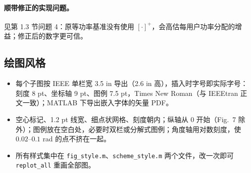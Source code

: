 \documentclass[11pt,a4paper]{ctexart}
\newcommand{\code}[1]{\texttt{#1}}
\begin{document}
\paragraph{顺带修正的实现问题。}见第 1.3 节问题 4：原等功率基准没有使用 $[\cdot]^+$，会高估每用户功率分配的增益；修正后的数字更可信。

\subsection{绘图风格}
\begin{itemize}
\item 每个子图按 IEEE 单栏宽 3.5 in 导出（2.6 in 高），插入时字号即实际字号：刻度 8 pt、坐标轴 9 pt、图例 7.5 pt，Times New Roman（与 IEEEtran 正文一致）；MATLAB 下导出嵌入字体的矢量 PDF。
\item 空心标记、1.2 pt 线宽、细点状网格、刻度朝内；纵轴从 0 开始（Fig.~7 除外）；图例放在空白处，必要时双栏或分解式图例；角度轴用对数刻度，使 $0.02$--$0.1$ rad 的点不挤在一起。
\item 所有样式集中在 \code{fig\_style.m}、\code{scheme\_style.m} 两个文件，改一次即可 \code{replot\_all} 重画全部图。
\end{itemize}
\end{document}
